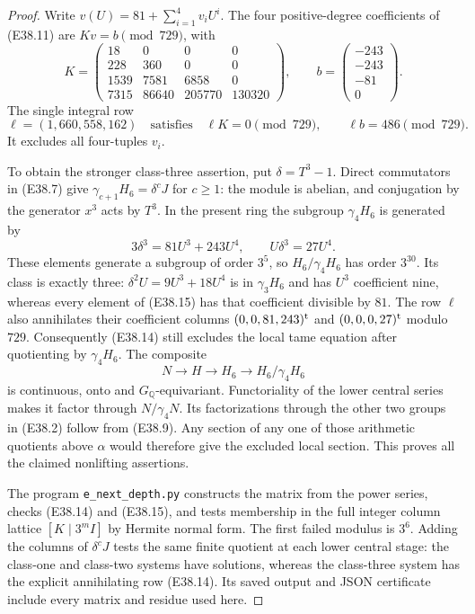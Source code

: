 \begin{proof}
Write $v(U)=81+\sum_{i=1}^4v_iU^i$. The four
positive-degree coefficients of (E38.11) are
$Kv=b\pmod{729}$, with
\[
 K=\begin{pmatrix}
 18&0&0&0\\
 228&360&0&0\\
 1539&7581&6858&0\\
 7315&86640&205770&130320
 \end{pmatrix},\qquad
 b=\begin{pmatrix}-243\\-243\\-81\\0\end{pmatrix}.
 \tag{E38.13}
\]
The single integral row
\[
 \ell=(1,660,558,162)
 \quad\text{satisfies}\quad
 \ell K=0\pmod{729},\qquad \ell b=486\pmod{729}.
 \tag{E38.14}
\]
It excludes all four-tuples $v_i$.

To obtain the stronger class-three assertion, put
$\delta=T^3-1$. Direct commutators in (E38.7) give
$\gamma_{c+1}H_6=\delta^cJ$ for $c\ge1$:
the module is abelian, and conjugation by the
generator $x^3$ acts by $T^3$.
In the present ring the subgroup $\gamma_4H_6$
is generated by
\[
 3\delta^3=81U^3+243U^4,\qquad
 U\delta^3=27U^4.
 \tag{E38.15}
\]
These elements generate a subgroup of order $3^5$,
so $H_6/\gamma_4H_6$ has order $3^{30}$.
Its class is exactly three: $\delta^2U=9U^3+18U^4$
is in $\gamma_3H_6$ and has $U^3$ coefficient nine,
whereas every element of (E38.15) has that coefficient
divisible by $81$.
The row $\ell$ also annihilates their coefficient
columns $(0,0,81,243)^{\rm t}$ and
$(0,0,0,27)^{\rm t}$ modulo $729$.
Consequently (E38.14) still excludes the local tame
equation after quotienting by $\gamma_4H_6$.
The composite
\[
 N\longrightarrow H\longrightarrow H_6
              \longrightarrow H_6/\gamma_4H_6
 \tag{E38.16}
\]
is continuous, onto and $G_{\mathbb Q}$-equivariant.
Functoriality of the lower central series makes it
factor through $N/\gamma_4N$. Its factorizations
through the other two groups in (E38.2) follow from
(E38.9). Any section of any one of those arithmetic
quotients above $\alpha$ would therefore give the
excluded local section. This proves all the claimed
nonlifting assertions.

The program \texttt{e\_next\_depth.py} constructs the
matrix from the power series, checks (E38.14) and
(E38.15), and tests membership in the full integer
column lattice $[K\mid3^mI]$ by Hermite normal form.
The first failed modulus is $3^6$.
Adding the columns of $\delta^cJ$ tests the same
finite quotient at each lower central stage: the
class-one and class-two systems have solutions,
whereas the class-three system has the explicit
annihilating row (E38.14). Its saved output and
JSON certificate include every matrix and residue
used here.
\end{proof}
